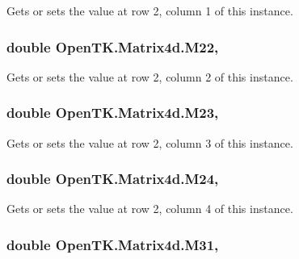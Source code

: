 Gets or sets the value at row 2, column 1 of this instance. 

\hypertarget{struct_open_t_k_1_1_matrix4d_abb1e0debae03676f435ba7e219e36070}{
\subsubsection[{M22}]{\setlength{\rightskip}{0pt plus 5cm}double Open\-T\-K.\-Matrix4d.\-M22\hspace{0.3cm}{\ttfamily [get]}, {\ttfamily [set]}}}\label{struct_open_t_k_1_1_matrix4d_abb1e0debae03676f435ba7e219e36070}


Gets or sets the value at row 2, column 2 of this instance. 

\hypertarget{struct_open_t_k_1_1_matrix4d_a53f4f587ab0a2f21f311d701443087be}{
\subsubsection[{M23}]{\setlength{\rightskip}{0pt plus 5cm}double Open\-T\-K.\-Matrix4d.\-M23\hspace{0.3cm}{\ttfamily [get]}, {\ttfamily [set]}}}\label{struct_open_t_k_1_1_matrix4d_a53f4f587ab0a2f21f311d701443087be}


Gets or sets the value at row 2, column 3 of this instance. 

\hypertarget{struct_open_t_k_1_1_matrix4d_aa393e28192768f91e94b57968153eba4}{
\subsubsection[{M24}]{\setlength{\rightskip}{0pt plus 5cm}double Open\-T\-K.\-Matrix4d.\-M24\hspace{0.3cm}{\ttfamily [get]}, {\ttfamily [set]}}}\label{struct_open_t_k_1_1_matrix4d_aa393e28192768f91e94b57968153eba4}


Gets or sets the value at row 2, column 4 of this instance. 

\hypertarget{struct_open_t_k_1_1_matrix4d_aa2d05b2c70e0fc88927bd1ae8951c52c}{
\subsubsection[{M31}]{\setlength{\rightskip}{0pt plus 5cm}double Open\-T\-K.\-Matrix4d.\-M31\hspace{0.3cm}{\ttfamily [get]}, {\ttfamily [set]}}}\label{struct_open_t_k_1_1_matrix4d_aa2d05b2c70e0fc88927bd1ae8951c52c}


